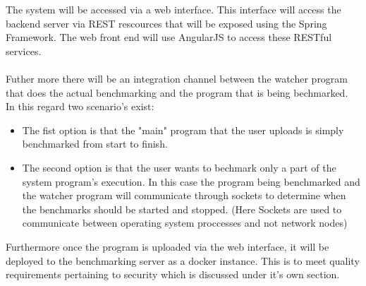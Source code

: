 The system will be accessed via a web interface. This interface will access the
backend server via REST rescources that will be exposed using the Spring
Framework. The web front end will use AngularJS to access these RESTful services.\\ \\
Futher more there will be an integration channel between the watcher program that
does the actual benchmarking and the program that is being bechmarked.\\
In this regard two scenario's exist:
\begin{itemize}
	\item The fist option is that the "main" program that the user uploads is simply
	benchmarked from start to finish.
	\item The second option is that the user wants to bechmark only a part of the
	system program's execution. In this case the program being benchmarked and
	the watcher program will communicate through sockets to determine when the
	benchmarks should be started and stopped. (Here Sockets are used to communicate
	between operating system proccesses and not network nodes)
\end{itemize}
\newline
Furthermore once the program is uploaded via the web interface, it will be deployed
to the benchmarking server as a docker instance. This is to meet quality requirements
pertaining to security which is discussed under it's own section.
